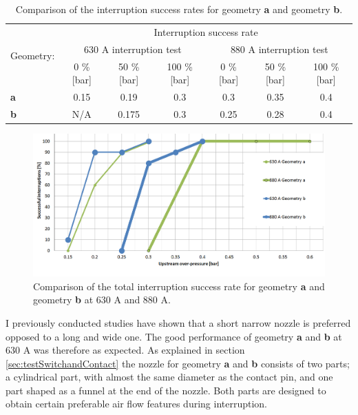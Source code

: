 \documentclass[10pt,b5paper,twoside]{article}
\begin{document}
\begin{table}[h]
\center
\caption{Comparison of the interruption success rates for geometry \textbf{a} and geometry \textbf{b}.}
\begin{tabular}{|l|c|c|c|c|c|c|}
\hline
\multirow{3}{*}{Geometry:} & \multicolumn{6}{|c|}{Interruption success rate}                                                           \\ \cline{2-7} 
                          & \multicolumn{3}{|c}{630 A interruption test}        & \multicolumn{3}{|c|}{880 A interruption test}       \\ \cline{2-7} 
                          & 0 \% {[}bar{]} & 50 \% {[}bar{]} & 100 \% {[}bar{]} & 0 \% {[}bar{]} & 50 \% {[}bar{]} & 100 \% {[}bar{]} \\ \hline
\textbf{a}                & 0.15           & 0.19            & 0.3              & 0.3            & 0.35            & 0.4              \\ \hline
\textbf{b}                & N/A            & 0.175           & 0.3              & 0.25           & 0.28            & 0.4              \\ \hline
\end{tabular}
\label{tab:compgeoAandB}
\end{table}

\begin{figure}[H]
\centering
\includegraphics[scale=0.5, angle =90 ]{Bilder/Results/compGeoAandBNew2.PNG}
\caption{Comparison of the total interruption success rate for geometry \textbf{a} and geometry \textbf{b} at 630 A and 880 A.} \label{fig:compgeoAandBAllcurrents}
\end{figure}

I previously conducted studies have shown that a short narrow nozzle is preferred opposed to a long and wide one. The good performance of geometry \textbf{a} and \textbf{b} at 630 A was therefore as expected. As explained in section \ref{sec:testSwitchandContact} the nozzle for geometry \textbf{a} and \textbf{b} consists of two parts; a cylindrical part, with almost the same diameter as the contact pin, and one part shaped as a funnel at the end of the nozzle. Both parts are designed to obtain certain preferable air flow features during interruption.
\end{document}

